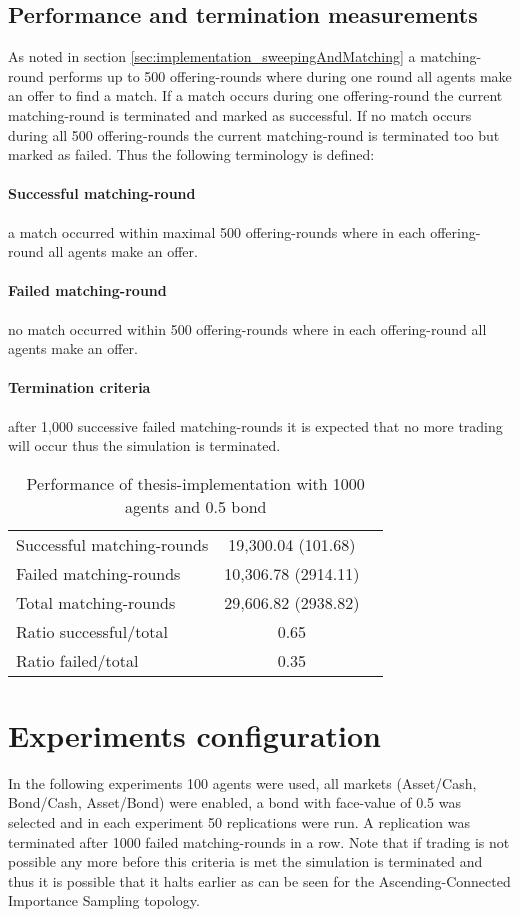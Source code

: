 \documentclass[Bachelorarbeit.tex]{subfiles}
\begin{document}
\subsection{Performance and termination measurements}
As noted in section \ref{sec:implementation_sweepingAndMatching} a matching-round performs up to 500 offering-rounds where during one round all agents make an offer to find a match. If a match occurs during one offering-round the current matching-round is terminated and marked as successful. If no match occurs during all 500 offering-rounds the current matching-round is terminated too but marked as failed. Thus the following terminology is defined:

\paragraph{Successful matching-round} a match occurred within maximal 500 offering-rounds where in each offering-round all agents make an offer.
\paragraph{Failed matching-round} no match occurred within 500 offering-rounds where in each offering-round all agents make an offer.
\paragraph{Termination criteria} after 1,000 successive failed matching-rounds it is expected that no more trading will occur thus the simulation is terminated.

\begin{table}[H]
	\centering
	\caption{Performance of thesis-implementation with 1000 agents and 0.5 bond}
	\begin{tabular} { l c r }
		\hline
		Successful matching-rounds & 19,300.04 (101.68) \\
		Failed matching-rounds & 10,306.78 (2914.11) \\
		Total matching-rounds & 29,606.82 (2938.82) \\
		\hline
		Ratio successful/total & 0.65 \\
		Ratio failed/total & 0.35 \\
		\hline
	\end{tabular}
\end{table}


\section{Experiments configuration}
In the following experiments 100 agents were used, all markets (Asset/Cash, Bond/Cash, Asset/Bond) were enabled, a bond with face-value of 0.5 was selected and in each experiment 50 replications were run. A replication was terminated after 1000 failed matching-rounds in a row. Note that if trading is not possible any more before this criteria is met the simulation is terminated and thus it is possible that it halts earlier as can be seen for the Ascending-Connected Importance Sampling topology.
\end{document}
